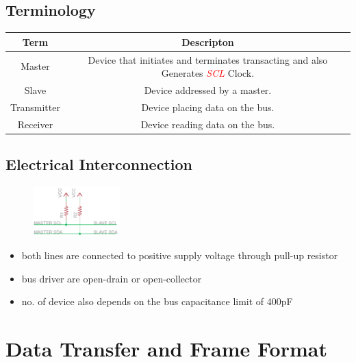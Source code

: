 \documentclass{article}
\newcommand{\pinFormat}[1]{\emph{\textcolor{red}{#1}}}
\begin{document}
\subsection{Terminology}
\begin{table}[H]
    \begin{center}
        \begin{tabular}{c|c}
            \textbf{Term} & \textbf{Descripton}\\
            \hline
            Master & Device that initiates and terminates transacting and also Generates \pinFormat{SCL} Clock.\\
            Slave & Device addressed by a master.\\
            Transmitter & Device placing data on the bus.\\
            Receiver & Device reading data on the bus.\\
        \end{tabular}
    \end{center}
\end{table}

\subsection{Electrical Interconnection}
\begin{figure}[H]
    \centering
    \includegraphics[width=0.3\textwidth]{i2cElectrical.png}
\end{figure}
\begin{itemize}
    \item both lines are connected to positive supply voltage through pull-up resistor
    \item bus driver are open-drain or open-collector
    \item no. of device also depends on the bus capacitance limit of 400pF
\end{itemize}

\section{Data Transfer and Frame Format}
\end{document}
